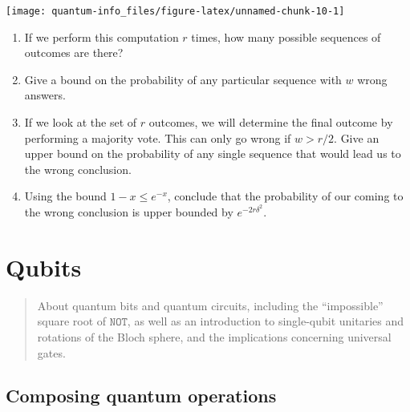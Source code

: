 \documentclass{article}
\providecommand{\tightlist}{%
  \setlength{\itemsep}{0pt}\setlength{\parskip}{0pt}}
\begin{document}
\begin{center}\texttt{[image: quantum-info\_files/figure-latex/unnamed-chunk-10-1]} \end{center}

\begin{enumerate}
\def\labelenumi{\arabic{enumi}.}
\tightlist
\item
  If we perform this computation \(r\) times, how many possible sequences of outcomes are there?
\item
  Give a bound on the probability of any particular sequence with \(w\) wrong answers.
\item
  If we look at the set of \(r\) outcomes, we will determine the final outcome by performing a majority vote.
  This can only go wrong if \(w>r/2\).
  Give an upper bound on the probability of any single sequence that would lead us to the wrong conclusion.
\item
  Using the bound \(1-x\leq e^{-x}\), conclude that the probability of our coming to the wrong conclusion is upper bounded by \(e^{-2r\delta^2}\).
\end{enumerate}

\hypertarget{chapter2}{%
\section{Qubits}\label{chapter2}}

\begin{quote}
About quantum bits and quantum circuits, including the ``impossible'' square root of \(\texttt{NOT}\), as well as an introduction to single-qubit unitaries and rotations of the Bloch sphere, and the implications concerning universal gates.
\end{quote}

\hypertarget{composing-quantum-operations}{%
\subsection{Composing quantum operations}\label{composing-quantum-operations}}
\end{document}
